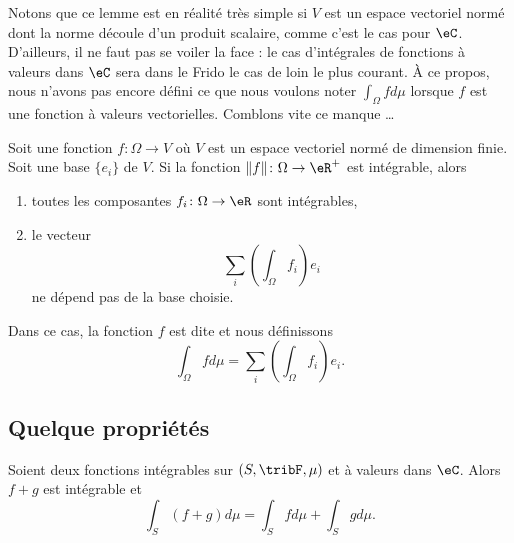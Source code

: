 Notons que ce lemme est en réalité très simple si \( V\) est un espace vectoriel normé dont la norme découle d'un produit scalaire, comme c'est le cas pour \( \eC\). D'ailleurs, il ne faut pas se voiler la face : le cas d'intégrales de fonctions à valeurs dans \( \eC\) sera dans le Frido le cas de loin le plus courant. À ce propos, nous n'avons pas encore défini ce que nous voulons noter \( \int_{\Omega}fd\mu\) lorsque \( f\) est une fonction à valeurs vectorielles. Comblons vite ce manque \ldots

\begin{propositionDef}
    Soit une fonction \( f\colon \Omega\to V\) où \( V\) est un espace vectoriel normé de dimension finie. Soit une base \( \{ e_i \}\) de \( V\).  Si la fonction \( \| f \|\colon \Omega\to \eR^+\) est intégrable, alors
    \begin{enumerate}
        \item
            toutes les composantes \( f_i\colon \Omega\to \eR\) sont intégrables,
        \item
            le vecteur
            \begin{equation}        \label{EQooQCKMooZCbybq}
                \sum_i(\int_{\Omega}f_i) e_i
            \end{equation}
            ne dépend pas de la base choisie.
    \end{enumerate}
    Dans ce cas, la fonction \( f\) est dite  et nous définissons
    \begin{equation}
        \int_{\Omega}fd\mu=\sum_i(\int_{\Omega}f_i) e_i.
    \end{equation}
\end{propositionDef}

\subsection{Quelque propriétés}

\begin{proposition}     \label{PROPooFIYEooCpdmwZ}
    Soient deux fonctions intégrables sur \( (S,\tribF,\mu)\) et à valeurs dans \( \eC\). Alors \( f+g\) est intégrable et 
    \begin{equation}
        \int_S(f+g)d\mu=\int_Sfd\mu+\int_Sgd\mu.
    \end{equation}
\end{proposition}

